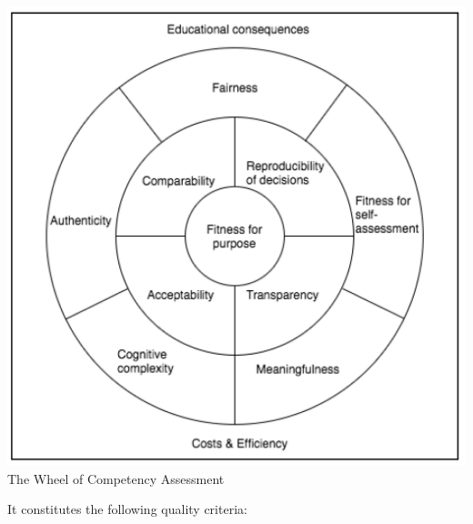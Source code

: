 %

\begin{center}
\includegraphics[scale=0.6]{figures/AdaptedQualityCriteriaCatete.png}
The Wheel of Competency Assessment \cite{baartman2006wheel}\label{fig:AssQualityCriteria}
\end{center}


It constitutes the following quality criteria:

